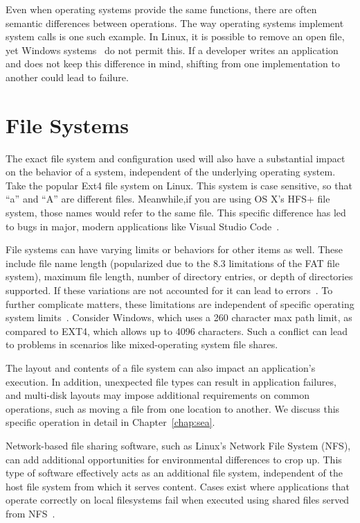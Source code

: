 Even when operating systems provide the same functions,
there are often semantic differences between operations. 
The way operating systems
implement system calls is one such example.  In Linux, it is possible to remove an open file, yet Windows systems~\cite{UnlinkStandard} do not permit this.  If a developer writes an application
and does not keep this difference in mind, shifting from one implementation to another could lead to failure.

\section{File Systems}

The exact file system and configuration used will also have a
substantial impact on the behavior of a system, independent of the underlying
operating system. Take the popular Ext4 file system on Linux. This system is case sensitive,
so that ``a'' and ``A'' are different files.
Meanwhile,if you are using OS X's HFS+ file system,
those names would refer to the same file.
This specific difference has led to bugs in major, modern applications like Visual Studio Code~\cite{vscodebug}.

File systems can have varying limits or behaviors for other items as well. These include file name length (popularized due to the 8.3 limitations of the
FAT file system), maximum file length, number of directory entries, or
depth
of directories supported.
If these variations are not accounted for it can lead to errors~\cite{EXT4Layout, AppleHFS}.
To further complicate matters,
these limitations are independent of specific operating system limits~\cite{windowspath}.
Consider Windows,
which uses a 260 character max path limit, as compared to EXT4, which allows up to 4096 characters.
Such a conflict can lead to problems in scenarios like mixed-operating system file shares.

The layout and contents of a file system can also impact an application's
execution.  In addition, unexpected file types can result in application
failures, and multi-disk layouts may impose additional requirements on
common operations, such as moving a file from one location to
another.  We discuss this specific operation in detail in Chapter~\ref{chap:sea}.

Network-based file sharing software, such as Linux's Network File System (NFS), can add  additional opportunities for environmental differences to crop up. This type of software effectively acts as an additional file system, independent of the host file system from which it serves content.
Cases exist where applications that operate correctly on local filesystems fail when executed using shared files served from NFS~\cite{gitlabbug}.


